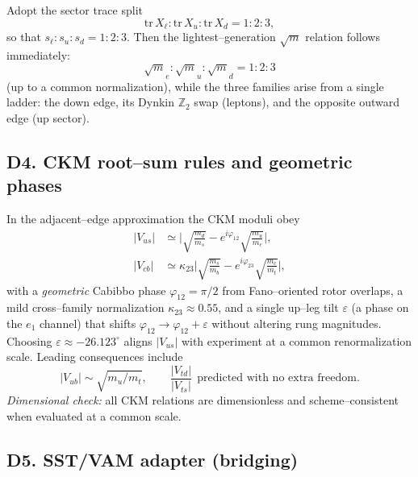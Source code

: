 \documentclass[11pt]{article}
\begin{document}
          Adopt the sector trace split
          \begin{equation}\tag{D7}
          \mathrm{tr}\,X_{\ell} : \mathrm{tr}\,X_{u} : \mathrm{tr}\,X_{d} = 1:2:3,
          \end{equation}
          so that $s_{\ell}:s_{u}:s_{d}=1:2:3$. Then the lightest–generation $\sqrt{m}$ relation follows immediately:
          \begin{equation}\tag{D8}
          \boxed{\; \sqrt{m}_{e} : \sqrt{m}_{u} : \sqrt{m}_{d} = 1:2:3 \;}
          \end{equation}
          (up to a common normalization), while the three families arise from a single ladder: the down edge, its Dynkin $\mathbb{Z}_{2}$ swap (leptons), and the opposite outward edge (up sector).

      \subsection*{D4. CKM root–sum rules and geometric phases}

          In the adjacent–edge approximation the CKM moduli obey
          \begin{align}\tag{D9}
          |V_{us}|&\simeq \Big|\sqrt{\tfrac{m_{d}}{m_{s}}}-e^{i\varphi_{12}}\sqrt{\tfrac{m_{u}}{m_{c}}}\Big|,\\
          |V_{cb}|&\simeq \kappa_{23}\Big|\sqrt{\tfrac{m_{s}}{m_{b}}}-e^{i\varphi_{23}}\sqrt{\tfrac{m_{c}}{m_{t}}}\Big|,
          \end{align}
          with a \emph{geometric} Cabibbo phase $\varphi_{12}=\pi/2$ from Fano–oriented rotor overlaps, a mild cross–family normalization $\kappa_{23}\approx 0.55$, and a single up–leg tilt $\varepsilon$ (a phase on the $e_{1}$ channel) that shifts $\varphi_{12}\to\varphi_{12}+\varepsilon$ without altering rung magnitudes. Choosing $\varepsilon\approx -26.123^\circ$ aligns $|V_{us}|$ with experiment at a common renormalization scale. Leading consequences include
          \begin{equation}\tag{D10}
          |V_{ub}|\sim \sqrt{m_{u}/m_{t}},\qquad \frac{|V_{td}|}{|V_{ts}|}\ \ \text{predicted with no extra freedom}.
          \end{equation}
          \textit{Dimensional check:} all CKM relations are dimensionless and scheme–consistent when evaluated at a common scale.

      \subsection*{D5. SST/VAM adapter (bridging)}
\end{document}
